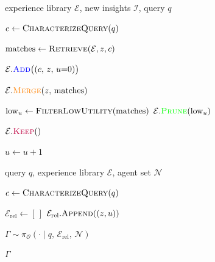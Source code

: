 \begin{algorithm}[H]
\caption{ExperienceLibraryUpdate (ADD / MERGE / PRUNE / KEEP)}
\begin{algorithmic}[1]
\Require experience library $\mathcal{E}$, new insights $\mathcal{I}$, query $q$

\State $c \leftarrow \textsc{CharacterizeQuery}(q)$

    \State $\text{matches} \leftarrow \textsc{Retrieve}(\mathcal{E}, z, c)$

        \State $\mathcal{E}.\textcolor{blue}{\textsc{Add}}\bigl((c,\, z,\, u{=}0)\bigr)$

        \State $\mathcal{E}.\textcolor{orange}{\textsc{Merge}}(z,\, \text{matches})$

        \State $\text{low}_u \leftarrow \textsc{FilterLowUtility}(\text{matches})$
        \State $\mathcal{E}.\textcolor{green}{\textsc{Prune}}(\text{low}_u)$

    \Else
        \State $\mathcal{E}.\textcolor{purple}{\textsc{Keep}}()$
    \EndIf
\EndFor

        \State $u \leftarrow u + 1$
    \EndIf
\EndFor
\end{algorithmic}
\end{algorithm}


\begin{algorithm}[H]
\caption{Orchestrate (experience-guided topology sampling)}
\begin{algorithmic}[1]
\Require query $q$, experience library $\mathcal{E}$, agent set $\mathcal{N}$

\State $c \leftarrow \textsc{CharacterizeQuery}(q)$

\State $\mathcal{E}_{\text{rel}} \leftarrow [\,]$
        \State $\mathcal{E}_{\text{rel}}.\textsc{Append}((z, u))$
    \EndIf
\EndFor

\State $\Gamma \sim \pi_{\mathcal{O}}\!\left(\cdot \mid q,\, \mathcal{E}_{\text{rel}},\, \mathcal{N}\right)$

\State \Return $\Gamma$
\end{algorithmic}
\end{algorithm}


